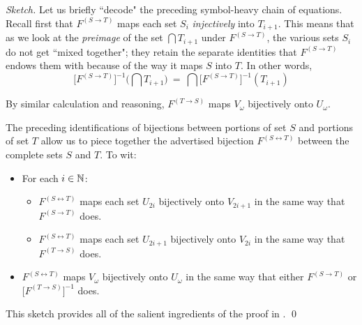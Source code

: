 \begin{proof}[Sketch]
\smallskip

Let us briefly ``decode" the preceding symbol-heavy chain of equations.  Recall first that $F^{(S \rightarrow T)}$ maps each set $S_i$ {\em injectively} into $T_{i+1}$.  This means that as we look at the {\it preimage} of the set $\bigcap T_{i+1}$ under $F^{(S \rightarrow T)}$, the various sets $S_i$ do not get ``mixed together"; they retain the separate identities that $F^{(S \rightarrow T)}$ endows them with because of the way it maps $S$ into $T$.  In other words,
\[ \Big[F^{(S \rightarrow T)}\Big]^{-1} \Big(\bigcap T_{i+1} \Big) \ = \
\bigcap \Big[F^{(S \rightarrow T)}\Big]^{-1} (T_{i+1}) \]


\smallskip

\noindent
By similar calculation and reasoning, $F^{(T \rightarrow S)}$ maps $V_\omega$ bijectively onto $U_\omega$.

\medskip

The preceding identifications of bijections between portions of set $S$ and portions of set $T$ allow us to piece together the advertised bijection $F^{(S \leftrightarrow T)}$ between the complete sets $S$ and $T$.  To wit:
\begin{itemize}
\item
For each $i \in \mathbb{N}$:
  \begin{itemize}
  \item
$F^{(S \leftrightarrow T)}$ maps each set $U_{2i}$ bijectively onto $V_{2i+1}$ in the same way that $F^{(S \rightarrow T)}$ does.
  \item
$F^{(S \leftrightarrow T)}$ maps each set $U_{2i+1}$ bijectively onto $V_{2i}$ in the same way that $F^{(T \rightarrow S)}$ does.
\end{itemize}

\item
$F^{(S \leftrightarrow T)}$ maps $V_\omega$ bijectively onto $U_\omega$ in the same way that either $F^{(S \rightarrow T)}$ or $\Big[F^{(T \rightarrow S)}\Big]^{-1}$ does.
\end{itemize}
This sketch provides all of the salient ingredients of the proof in \cite{Tonien07}.  \qed
\end{proof}

\bigskip


